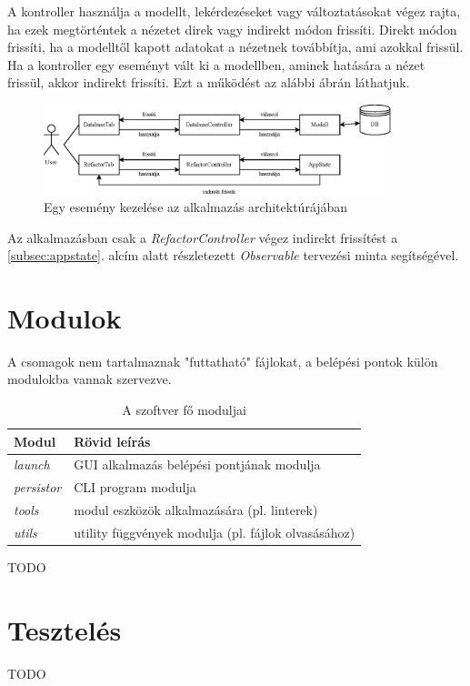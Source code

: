 A kontroller használja a modellt, lekérdezéseket vagy változtatásokat végez rajta,
ha ezek megtörténtek a nézetet direk vagy indirekt módon frissíti.
Direkt módon frissíti, ha a modelltől kapott adatokat a nézetnek továbbítja,
ami azokkal frissül.
Ha a kontroller egy eseményt vált ki a modellben, aminek hatására a nézet frissül,
akkor indirekt frissíti.
Ezt a működést az alábbi ábrán láthatjuk.

\begin{figure}[H]
	\centering
	\includegraphics[width=0.9\textwidth]{images/figs/MVC.eps}
	\caption{Egy esemény kezelése az alkalmazás architektúrájában}
\end{figure}

Az alkalmazásban csak a \emph{RefactorController} végez indirekt frissítést a
\ref{subsec:appstate}. alcím alatt részletezett \emph{Observable} tervezési minta
segítségével. 

\section{Modulok}
\label{sec:modules}

A csomagok nem tartalmaznak "futtatható" fájlokat,
a belépési pontok külön modulokba vannak szervezve.

\begin{table}[H]
	\centering
	\begin{tabular}{ | m{} | m{} | }
		\hline
		\textbf{Modul} & \textbf{Rövid leírás} \\
		\hline \hline
		\emph{launch} & GUI alkalmazás belépési pontjának modulja \\
		\hline
		\emph{persistor} & CLI program modulja \\
		\hline
		\emph{tools} & modul eszközök alkalmazására (pl. linterek) \\
		\hline
		\emph{utils} & utility függvények modulja (pl. fájlok olvasásához)  \\
		\hline
	\end{tabular}
	\caption{A szoftver fő moduljai}
	\label{tab:modules}
\end{table}

TODO

\pagebreak

\section{Tesztelés}

TODO

\pagebreak

